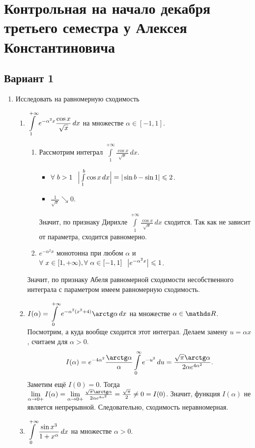 \documentclass{article}
\begin{document}
\pagestyle{plain}
\section*{Контрольная на начало декабря третьего семестра у Алексея Константиновича}
\subsection*{Вариант 1}
\begin{enumerate}
\item Исследовать на равномерную сходимость
\begin{enumerate}
\item $\displaystyle\int\limits_1^{+\infty}e^{-\alpha^2x}\frac{\cos x}{\sqrt x}\,dx$ на множестве $\alpha\in[-1,1]$.
\begin{enumerate}
\item Рассмотрим интеграл $\int\limits_1^{+\infty}\frac{\cos x}{\sqrt x}\,dx$.
\begin{itemize}
\item $\forall\ b>1\pau\Big|\int\limits_1^b\cos x\,dx\Big|=|\sin b - \sin 1|\le 2$.
\item $\frac1{\sqrt x}\searrow0$.
\end{itemize}
Значит, по признаку Дирихле $\int\limits_1^{+\infty}\frac{\cos x}{\sqrt x}\,dx$ сходится. Так как не зависит от параметра, сходится равномерно.
\item $e^{-\alpha^2 x}$ монотонна при любом $\alpha$ и $\forall\ x\in[1,+\infty),\forall\ \alpha\in[-1,1]\pau \big|e^{-\alpha^2 x}\big|\le 1$. 
\end{enumerate}
Значит, по признаку Абеля равномерной сходимости несобственного интеграла с параметром имеем равномерную сходимость.
\item $\ds I(\alpha)=\int\limits_0^{+\infty}e^{-\alpha^2(x^2+4)}\arctg \alpha\,dx$ на множестве $\alpha\in\R$. Посмотрим, а куда вообще сходится этот интеграл. Делаем замену $u=\alpha x$, считаем для $\alpha>0$.
\[I(\alpha)=e^{-4\alpha^2}\frac{\arctg \alpha}{\alpha}\intop_0^{\infty}e^{-u^2}\,du=\frac{\sqrt\pi\arctg \alpha}{2\alpha e^{4\alpha^2}}.\]
Заметим ещё $I(0)=0$. Тогда $\yo{\alpha}{0+}I(\alpha)=\yo{\alpha}{0+}\frac{\sqrt\pi\arctg \alpha}{2\alpha e^{4\alpha^2}}=\frac{\sqrt{\pi}}2\ne0=I(0)$. Значит, функция $I(\alpha)$ не является непрерывной. Следовательно, сходимость неравномерная.
\item $\displaystyle\int\limits_0^{+\infty}\frac{\sin x^3}{1+x^{\alpha}}\,dx$ на множестве $\alpha>0$.
\end{enumerate}

\end{enumerate}
\end{document}
